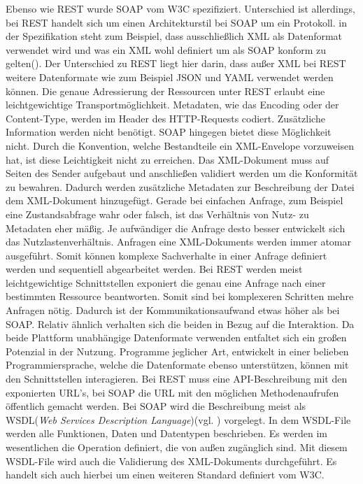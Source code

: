 \documentclass[fleqn,10pt,ngerman]{SelfArx}
\begin{document}
Ebenso wie REST wurde SOAP vom W3C spezifiziert. Unterschied ist allerdings, bei REST handelt sich um einen Architekturstil bei SOAP um ein Protokoll. in der Spezifikation steht zum Beispiel, dass ausschließlich XML als Datenformat verwendet wird und was ein XML wohl definiert um als SOAP konform zu gelten(\cite{w3cSOAP}). Der Unterschied zu REST liegt hier darin, dass außer XML bei REST weitere Datenformate wie zum Beispiel JSON und YAML verwendet werden können. Die genaue Adressierung der Ressourcen unter REST erlaubt eine leichtgewichtige Transportmöglichkeit. Metadaten, wie das Encoding oder der Content-Type, werden im Header des HTTP-Requests codiert. Zusätzliche Information werden nicht benötigt. SOAP hingegen bietet diese Möglichkeit nicht. Durch die Konvention, welche Bestandteile ein XML-Envelope vorzuweisen hat, ist diese Leichtigkeit nicht zu erreichen. Das XML-Dokument muss auf Seiten des Sender aufgebaut und anschließen validiert werden um die Konformität zu bewahren. Dadurch werden zusätzliche Metadaten zur Beschreibung der Datei dem XML-Dokument hinzugefügt. Gerade bei einfachen Anfrage, zum Beispiel eine Zustandsabfrage wahr oder falsch, ist das Verhältnis von Nutz- zu Metadaten eher mäßig. Je aufwändiger die Anfrage desto besser entwickelt sich das Nutzlastenverhältnis. Anfragen eine XML-Dokuments werden immer atomar ausgeführt. Somit können komplexe Sachverhalte in einer Anfrage definiert werden und sequentiell abgearbeitet werden. Bei REST werden meist leichtgewichtige Schnittstellen exponiert die genau eine Anfrage nach einer bestimmten Ressource beantworten. Somit sind bei komplexeren Schritten mehre Anfragen nötig. Dadurch ist der Kommunikationsaufwand etwas höher als bei SOAP. Relativ ähnlich verhalten sich die beiden in Bezug auf die Interaktion. Da beide Plattform unabhängige Datenformate verwenden entfaltet sich ein großen Potenzial in der Nutzung. Programme jeglicher Art, entwickelt in einer belieben Programmiersprache, welche die Datenformate ebenso unterstützen, können mit den Schnittstellen interagieren. Bei REST muss eine API-Beschreibung mit den exponierten URL's, bei SOAP die URL mit den möglichen Methodenaufrufen öffentlich gemacht werden. Bei SOAP wird die Beschreibung meist als WSDL(\textit{Web Services Description Language})(vgl. \cite{w3cWSDL}) vorgelegt. In dem WSDL-File werden alle Funktionen, Daten und Datentypen beschrieben. Es werden im wesentlichen die Operation definiert, die von außen zugänglich sind. Mit diesem WSDL-File wird auch die Validierung des XML-Dokuments durchgeführt. Es handelt sich auch hierbei um einen weiteren Standard definiert vom W3C.
\end{document}
